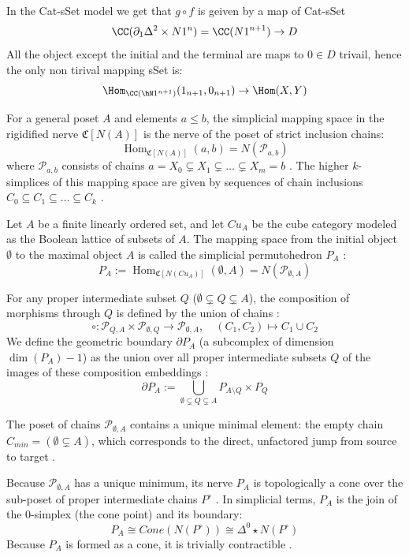 In the Cat-sSet model we get that $g \circ f$ is geiven by a map of Cat-sSet
\[
    \CC (\partial_1 \Delta^2 \times N 1^n) = \CC (N 1^{n+1}) \to D
\]
All the object except the initial and the terminal are maps to $0 \in D$ trivail, hence the only non tirival mapping sSet is:
\[
    \Hom_{\CC(\hN 1^{n+1})}(1_{n+1}, 0_{n+1}) \to \Hom(X,Y)
\]

\begin{defn}
    For a general poset $A$ and elements $a \le b$, the simplicial mapping space in the rigidified nerve $\mathfrak{C}[N(A)]$ is the nerve of the poset of strict inclusion chains:
    \[ \operatorname{Hom}_{\mathfrak{C}[N(A)]}(a, b) = N(\mathcal{P}_{a,b}) \]
    where $\mathcal{P}_{a,b}$ consists of chains $a = X_0 \subsetneq X_1 \subsetneq \dots \subsetneq X_m = b$ . The higher $k$-simplices of this mapping space are given by sequences of chain inclusions $C_0 \subseteq C_1 \subseteq \dots \subseteq C_k$ .
\end{defn}

\begin{defn}
    Let $A$ be a finite linearly ordered set, and let $Cu_A$ be the cube category modeled as the Boolean lattice of subsets of $A$. The mapping space from the initial object $\emptyset$ to the maximal object $A$ is called the simplicial permutohedron $P_A$ :
    \[ P_A := \operatorname{Hom}_{\mathfrak{C}[N(Cu_A)]}(\emptyset, A) = N(\mathcal{P}_{\emptyset, A}) \]
\end{defn}

\begin{defn}
    For any proper intermediate subset $Q$ ($\emptyset \subsetneq Q \subsetneq A$), the composition of morphisms through $Q$ is defined by the union of chains :
    \[ \circ : \mathcal{P}_{Q,A} \times \mathcal{P}_{\emptyset,Q} \to \mathcal{P}_{\emptyset,A}, \quad (C_1, C_2) \mapsto C_1 \cup C_2 \]
    We define the geometric boundary $\partial P_A$ (a subcomplex of dimension $\dim(P_A) - 1$) as the union over all proper intermediate subsets $Q$ of the images of these composition embeddings :
    \[ \partial P_A := \bigcup_{\emptyset \subsetneq Q \subsetneq A} P_{A \setminus Q} \times P_Q \]
\end{defn}

\begin{fact}
    The poset of chains $\mathcal{P}_{\emptyset, A}$ contains a unique minimal element: the empty chain $C_{min} = (\emptyset \subsetneq A)$, which corresponds to the direct, unfactored jump from source to target .

    Because $\mathcal{P}_{\emptyset, A}$ has a unique minimum, its nerve $P_A$ is topologically a cone over the sub-poset of proper intermediate chains $P^\circ$ . In simplicial terms, $P_A$ is the join of the 0-simplex (the cone point) and its boundary:
    \[ P_A \cong Cone(N(P^\circ)) \cong \Delta^0 \star N(P^\circ) \]
    Because $P_A$ is formed as a cone, it is trivially contractible .
\end{fact}


